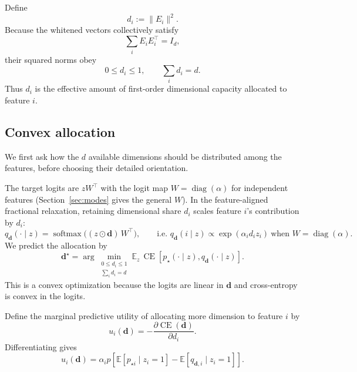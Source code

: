 Define
\begin{equation}
\boxed{
d_i:=\|E_i\|^2.
}
\label{eq:dimension-allocation}
\end{equation}
Because the whitened vectors collectively satisfy
\[
\sum_iE_iE_i^\top=I_d,
\]
their squared norms obey
\begin{equation}
\boxed{
0\le d_i\le1,
\qquad
\sum_i d_i=d.
}
\label{eq:dimension-budget}
\end{equation}
Thus \(d_i\) is the effective amount of first-order dimensional capacity allocated
to feature \(i\).

\subsection{Convex allocation}

We first ask how the \(d\) available dimensions should be distributed among the
features, before choosing their detailed orientation.

The target logits are \(zW^\top\) with the logit map \(W=\operatorname{diag}(\alpha)\)
for independent features (Section~\ref{sec:modes} gives the general \(W\)). In the
feature-aligned fractional relaxation, retaining dimensional share \(d_i\) scales
feature \(i\)'s contribution by \(d_i\):
\[
q_{\mathbf d}(\cdot\mid z)
=
\operatorname{softmax}\!\big((z\odot\mathbf d)\,W^\top\big),
\qquad\text{i.e. } q_{\mathbf d}(i\mid z)\propto\exp(\alpha_i d_i z_i)\ \text{when } W=\operatorname{diag}(\alpha).
\]
We predict the allocation by
\begin{equation}
\boxed{
\mathbf d^\star
=
\arg\min_{\substack{0\le d_i\le1\\ \sum_i d_i=d}}
\mathbb E_z\,
\operatorname{CE}
\left[
p_\star(\cdot\mid z),
q_{\mathbf d}(\cdot\mid z)
\right].
}
\label{eq:allocation-program}
\end{equation}
This is a convex optimization because the logits are linear in \(\mathbf d\) and
cross-entropy is convex in the logits.

Define the marginal predictive utility of allocating more dimension to feature
\(i\) by
\[
u_i(\mathbf d)
=
-
\frac{\partial\operatorname{CE}(\mathbf d)}
{\partial d_i}.
\]
Differentiating gives
\begin{equation}
\boxed{
u_i(\mathbf d)
=
\alpha_i p
\left[
\mathbb E[p_{\star i}\mid z_i=1]
-
\mathbb E[q_{\mathbf d,i}\mid z_i=1]
\right].
}
\label{eq:marginal-utility}
\end{equation}

